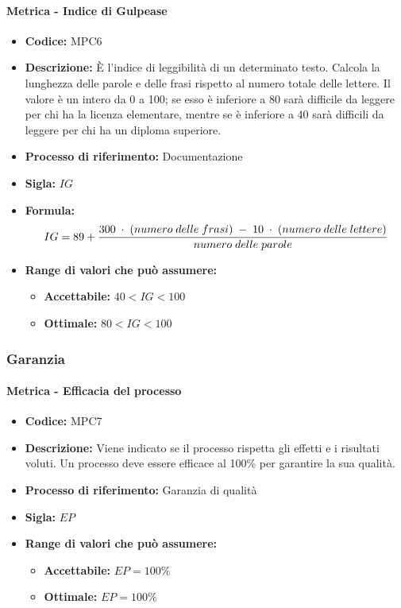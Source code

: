     \paragraph{Metrica - Indice di Gulpease}
    \begin{itemize}
        \item \textbf{Codice:} MPC6
        \item \textbf{Descrizione:} È l'indice di leggibilità di un determinato testo. Calcola la lunghezza delle parole e delle frasi rispetto al numero totale delle lettere. Il valore è un intero da 0 a 100; se esso è inferiore a 80 sarà difficile da leggere per chi ha la licenza elementare, mentre se è inferiore a 40 sarà difficili da leggere per chi ha un diploma superiore.
        \item \textbf{Processo di riferimento:} Documentazione
        \item \textbf{Sigla:} $IG$
        \item \textbf{Formula:} $$IG = 89 + {{300 \; \cdot \; (numero\; delle \; frasi) \; - \; 10 \; \cdot \; (numero \; delle \; lettere)}\over numero \; delle \; parole}$$
        \item \textbf{Range di valori che può assumere:}
        \begin{itemize}
            \item \textbf{Accettabile:} $40 < IG < 100$
            \item \textbf{Ottimale:} $80 < IG < 100$
        \end{itemize}
    \end{itemize}

\subsubsection{Garanzia}
    \paragraph{Metrica - Efficacia del processo}
    \begin{itemize}
        \item \textbf{Codice:} MPC7
        \item \textbf{Descrizione:} Viene indicato se il processo rispetta gli effetti e i risultati voluti. Un processo deve essere efficace al 100\% per garantire la sua qualità.
        \item \textbf{Processo di riferimento:} Garanzia di qualità
        \item \textbf{Sigla:} $EP$
        \item \textbf{Range di valori che può assumere:}
        \begin{itemize}
            \item \textbf{Accettabile:} $EP = 100\%$
            \item \textbf{Ottimale:} $EP = 100\%$
        \end{itemize}
    \end{itemize}

